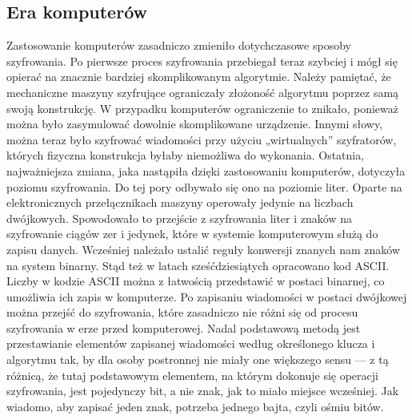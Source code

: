 \documentclass[a4paper, 10pt] {article}
\begin{document}
\subsection{Era komputerów}
Zastosowanie komputerów zasadniczo zmieniło dotychczasowe sposoby szyfrowania. Po pierwsze proces szyfrowania przebiegał teraz szybciej i mógł się opierać na znacznie bardziej skomplikowanym algorytmie. Należy pamiętać, że mechaniczne maszyny szyfrujące ograniczały złożoność algorytmu poprzez samą swoją konstrukcję. W przypadku komputerów ograniczenie to znikało, ponieważ można było zasymulować dowolnie skomplikowane urządzenie. Innymi słowy, można teraz było szyfrować wiadomości przy użyciu „wirtualnych” szyfratorów, których fizyczna konstrukcja byłaby niemożliwa do wykonania.
\newline
Ostatnia, najważniejsza zmiana, jaka nastąpiła dzięki zastosowaniu komputerów, dotyczyła poziomu szyfrowania. Do tej pory odbywało się ono na poziomie liter. Oparte na elektronicznych przełącznikach maszyny operowały jedynie na liczbach dwójkowych. Spowodowało to przejście z szyfrowania liter i znaków na szyfrowanie ciągów zer i jedynek, które w systemie komputerowym służą do zapisu danych. Wcześniej należało ustalić reguły konwersji znanych nam znaków na system binarny. Stąd też w latach sześćdziesiątych opracowano kod ASCII.
\newline
Liczby w kodzie ASCII można z łatwością przedstawić w postaci binarnej, co umożliwia ich zapis w komputerze. Po zapisaniu wiadomości w postaci dwójkowej można przejść do szyfrowania, które zasadniczo nie różni się od procesu szyfrowania w erze przed komputerowej. Nadal podstawową metodą jest przestawianie elementów zapisanej wiadomości według określonego klucza i algorytmu tak, by dla osoby postronnej nie miały one większego sensu — z tą różnicą, że tutaj podstawowym elementem, na którym dokonuje się operacji szyfrowania, jest pojedynczy bit, a nie znak, jak to miało miejsce wcześniej. Jak wiadomo, aby zapisać jeden znak, potrzeba jednego bajta, czyli ośmiu bitów.
\end{document}
